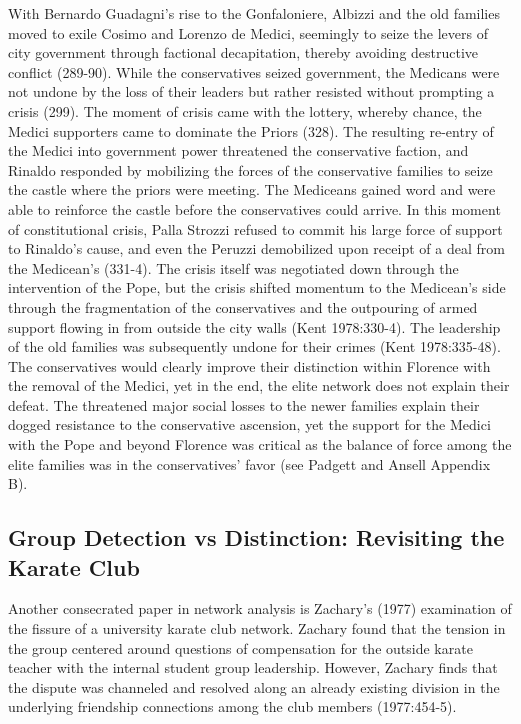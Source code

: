 \documentclass[12pt]{article}
\begin{document}
With Bernardo Guadagni’s rise to the Gonfaloniere, Albizzi and the old families moved to exile Cosimo and Lorenzo de Medici, seemingly to seize the levers of city government through factional decapitation, thereby avoiding destructive conflict (289-90). While the conservatives seized government, the Medicans were not undone by the loss of their leaders but rather resisted without prompting a crisis (299). The moment of crisis came with the lottery, whereby chance, the Medici supporters came to dominate the Priors (328). The resulting re-entry of the Medici into government power threatened the conservative faction, and Rinaldo responded by mobilizing the forces of the conservative families to seize the castle where the priors were meeting. The Mediceans gained word and were able to reinforce the castle before the conservatives could arrive. In this moment of constitutional crisis, Palla Strozzi refused to commit his large force of support to Rinaldo’s cause, and even the Peruzzi demobilized upon receipt of a deal from the Medicean’s (331-4). The crisis itself was negotiated down through the intervention of the Pope, but the crisis shifted momentum to the Medicean’s side through the fragmentation of the conservatives and the outpouring of armed support flowing in from outside the city walls (Kent 1978:330-4). The leadership of the old families was subsequently undone for their crimes (Kent 1978:335-48). The conservatives would clearly improve their distinction within Florence with the removal of the Medici, yet in the end, the elite network does not explain their defeat. The threatened major social losses to the newer families explain their dogged resistance to the conservative ascension, yet the support for the Medici with the Pope and beyond Florence was critical as the balance of force among the elite families was in the conservatives’ favor (see Padgett and Ansell Appendix B).  

\subsection{Group Detection vs Distinction: Revisiting the Karate Club}
Another consecrated paper in network analysis is Zachary’s (1977) examination of the fissure of a university karate club network. Zachary found that the tension in the group centered around questions of compensation for the outside karate teacher with the internal student group leadership. However, Zachary finds that the dispute was channeled and resolved along an already existing division in the underlying friendship connections among the club members (1977:454-5).   
\end{document}
